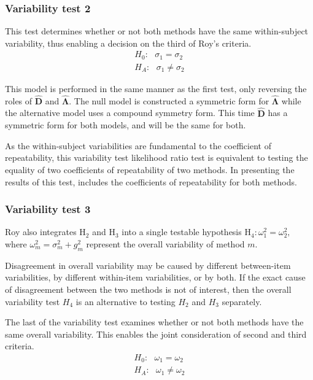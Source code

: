 \documentclass[12pt, a4paper]{report}
\theoremstyle{plain}
\theoremstyle{definition}
\theoremstyle{remark}
\begin{document}
	
	
	\subsubsection{Variability test 2}
	
	This test determines whether or not both methods have the same within-subject variability, thus enabling a decision on the third of Roy's criteria.
	\begin{eqnarray*}
		H_{0}: \mbox{ }\sigma_{1}  = \sigma_{2} \\
		H_{A}: \mbox{ }\sigma_{1}  \neq \sigma_{2}
	\end{eqnarray*}
	
	This model is performed in the same manner as the first test, only reversing the roles of $\boldsymbol{\hat{D}}$ and $\boldsymbol{\hat{\Lambda}}$. The null model is constructed a symmetric form for $\boldsymbol{\hat{\Lambda}}$ while the alternative model uses a compound symmetry form. This time $\boldsymbol{\hat{D}}$ has a symmetric form for both models, and will be the same for both.
	
	As the within-subject variabilities are fundamental to the coefficient of repeatability, this variability test likelihood ratio test is equivalent to testing the equality of two coefficients of repeatability of two methods. In presenting the results of this test, \citet{ARoy2009} includes the coefficients of repeatability for both methods.
	
	
	\subsubsection{Variability test 3}
	
	Roy also integrates $\mathrm{H}_2$ and $\mathrm{H}_3$ into a single testable hypothesis $\mathrm{H}_4\colon \omega^2_1=\omega^2_2,$ where $\omega^2_m = \sigma^2_m + g^2_m$ represent the overall variability of method $m.$ 
	
	
	Disagreement in overall variability may be caused by different between-item variabilities, by different within-item variabilities, or by both.  If the exact cause of disagreement between the two methods is not of interest, then the overall variability test $H_4$ is an alternative to testing $H_2$ and $H_3$ separately.
		
	
	The last of the variability test examines whether or not both methods have the same overall variability. This enables the joint consideration of second and third criteria.
	\begin{eqnarray*}
		H_{0}: \mbox{ }\omega_{1}  = \omega_{2} \\
		H_{A}: \mbox{ }\omega_{1}  \neq \omega_{2}
	\end{eqnarray*}
	
\end{document}
